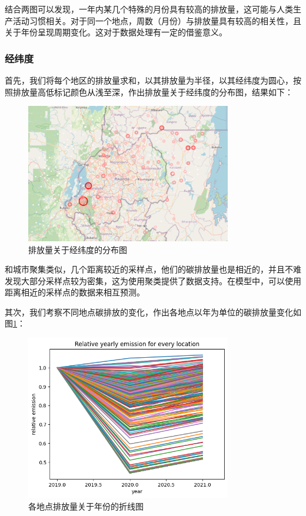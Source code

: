 \documentclass{ctexart}
\begin{document}
结合两图可以发现，一年内某几个特殊的月份具有较高的排放量，这可能与人类生产活动习惯相关。对于同一个地点，周数（月份）与排放量具有较高的相关性，且关于年份呈现周期变化。这对于数据处理有一定的借鉴意义。

\subsubsection{经纬度}

首先，我们将每个地区的排放量求和，以其排放量为半径，以其经纬度为圆心，按照排放量高低标记颜色从浅至深，作出排放量关于经纬度的分布图，结果如下：

\begin{figure}[H]
      \centering
      \includegraphics[width=0.8\textwidth]{output4.png}
      \caption{排放量关于经纬度的分布图}
\end{figure}

和城市聚集类似，几个距离较近的采样点，他们的碳排放量也是相近的，并且不难发现大部分采样点较为密集，这为使用聚类提供了数据支持。在模型中，可以使用距离相近的采样点的数据来相互预测。

其次，我们考察不同地点碳排放的变化，作出各地点以年为单位的碳排放量变化如图\ref{fig:5}：

\begin{figure}[H]
      \centering
      \includegraphics[width=0.8\textwidth]{output5.png}
      \caption{\label{fig:5}各地点排放量关于年份的折线图}
\end{figure}
\end{document}
